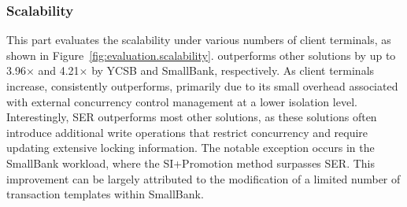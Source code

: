 \subsubsection{Scalability\label{sec:evaluation:scalability}}
This part evaluates the scalability under various numbers of client terminals, as shown in Figure~\ref{fig:evaluation.scalability}.
\sysname outperforms other solutions by up to 3.96$\times$ and 4.21$\times$ by YCSB and SmallBank, respectively. As client terminals increase, \sysname consistently outperforms, primarily due to its small overhead associated with external concurrency control management at a lower isolation level. Interestingly, SER outperforms most other solutions, as these solutions often introduce additional write operations that restrict concurrency and require updating extensive locking information. The notable exception occurs in the SmallBank workload, where the SI+Promotion method surpasses SER. This improvement can be largely attributed to the modification of a limited number of transaction templates within SmallBank.



